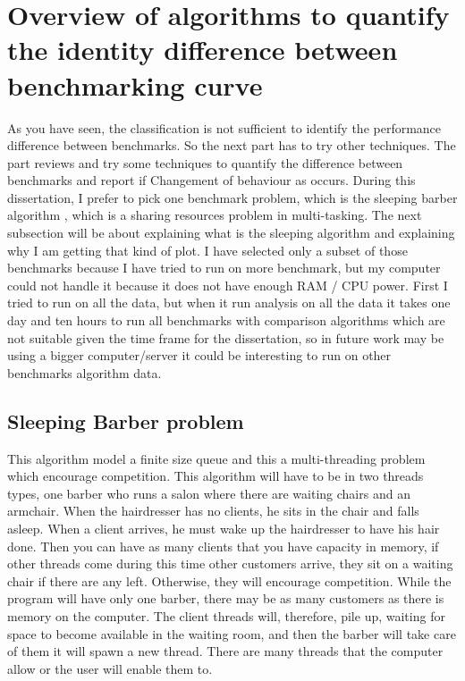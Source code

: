 \documentclass[12pt,a4paper]{article}
\begin{document}
\section{Overview of algorithms to quantify the identity difference between benchmarking curve}

As you have seen, the classification is not sufficient to identify the performance difference between benchmarks. So the next part has to try other techniques. The part reviews and try some techniques to quantify the difference between benchmarks and report if Changement of behaviour as occurs. During this dissertation, I prefer to pick one benchmark problem, which is the sleeping barber algorithm \citep{reynolds2002linda}, which is a sharing resources problem in multi-tasking. The next subsection will be about explaining what is the sleeping algorithm and explaining why I am getting that kind of plot. I have selected only a subset of those benchmarks because I have tried to run on more benchmark, but my computer could not handle it because it does not have enough RAM / CPU power. First I tried to run on all the data, but when it run analysis on all the data it takes one day and ten hours to run all benchmarks with comparison algorithms which are not suitable given the time frame for the dissertation, so in future work may be using a bigger computer/server it could be interesting to run on other benchmarks algorithm data.

\subsection{Sleeping Barber problem}
This algorithm model a finite size queue and this a multi-threading problem which encourage competition.
This algorithm will have to be in two threads types, one barber who runs a salon where there are waiting chairs and an armchair. When the hairdresser has no clients, he sits in the chair and falls asleep. When a client arrives, he must wake up the hairdresser to have his hair done. Then you can have as many clients that you have capacity in memory, if other threads come during this time other customers arrive, they sit on a waiting chair if there are any left. Otherwise, they will encourage competition.
While the program will have only one barber, there may be as many customers as there is memory on the computer. The client threads will, therefore, pile up, waiting for space to become available in the waiting room, and then the barber will take care of them it will spawn a new thread. There are many threads that the computer allow or the user will enable them to.
\end{document}
